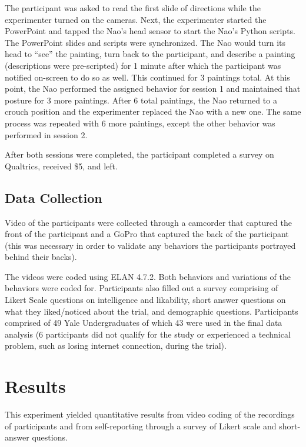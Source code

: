 \documentclass{acm_proc_article-sp}
\begin{document}
The participant was asked to read the first slide of directions while the experimenter turned on the cameras. Next, the experimenter started the PowerPoint and tapped the Nao's head sensor to start the Nao's Python scripts. The PowerPoint slides and scripts were synchronized. The Nao would turn its head to ``see'' the painting, turn back to the participant, and describe a painting (descriptions were pre-scripted) for 1 minute after which the participant was notified on-screen to do so as well. This continued for 3 paintings total. At this point, the Nao performed the assigned behavior for session 1 and maintained that posture for 3 more paintings. After 6 total paintings, the Nao returned to a crouch position and the experimenter replaced the Nao with a new one. The same process was repeated with 6 more paintings, except the other behavior was performed in session 2. 

After both sessions were completed, the participant completed a survey on Qualtrics, received \$5, and left.

\subsection{Data Collection}
Video of the participants were collected through a camcorder that captured the front of the participant and a GoPro that captured the back of the participant (this was necessary in order to validate any behaviors the participants portrayed behind their backs).

The videos were coded using ELAN 4.7.2. Both behaviors and variations of the behaviors were coded for. Participants also filled out a survey comprising of Likert Scale questions on intelligence and likability, short answer questions on what they liked/noticed about the trial, and demographic questions. Participants comprised of 49 Yale Undergraduates of which 43 were used in the final data analysis (6 participants did not qualify for the study or experienced a technical problem, such as losing internet connection, during the trial).

\section{Results}
This experiment yielded quantitative results from video coding of the recordings of participants and from self-reporting through a survey of Likert scale and short-answer questions. 
\end{document}
